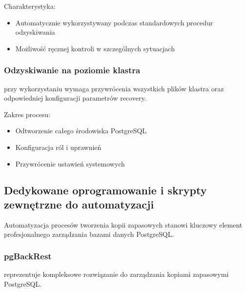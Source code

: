 \documentclass[letterpaper,10pt,polish]{sphinxmanual}
\begin{document}
\sphinxAtStartPar
Charakterystyka:
\begin{itemize}
\item {} 
\sphinxAtStartPar
Automatycznie wykorzystywany podczas standardowych procedur odzyskiwania

\item {} 
\sphinxAtStartPar
Możliwość ręcznej kontroli w szczególnych sytuacjach

\end{itemize}


\subsubsection{Odzyskiwanie na poziomie klastra}
\label{\detokenize{rozdzial2/Kopie_zapasowe_i_odzyskiwanie_danych/kopie_zapasowe_i_odzyskiwanie_danych:odzyskiwanie-na-poziomie-klastra}}
\sphinxAtStartPar
{} przy wykorzystaniu  wymaga przywrócenia wszystkich plików klastra oraz odpowiedniej konfiguracji parametrów recovery.

\sphinxAtStartPar
Zakres procesu:
\begin{itemize}
\item {} 
\sphinxAtStartPar
Odtworzenie całego środowiska PostgreSQL

\item {} 
\sphinxAtStartPar
Konfiguracja ról i uprawnień

\item {} 
\sphinxAtStartPar
Przywrócenie ustawień systemowych

\end{itemize}


\subsection{Dedykowane oprogramowanie i skrypty zewnętrzne do automatyzacji}
\label{\detokenize{rozdzial2/Kopie_zapasowe_i_odzyskiwanie_danych/kopie_zapasowe_i_odzyskiwanie_danych:dedykowane-oprogramowanie-i-skrypty-zewnetrzne-do-automatyzacji}}
\sphinxAtStartPar
Automatyzacja procesów tworzenia kopii zapasowych stanowi kluczowy element profesjonalnego zarządzania bazami danych PostgreSQL.


\subsubsection{pgBackRest}
\label{\detokenize{rozdzial2/Kopie_zapasowe_i_odzyskiwanie_danych/kopie_zapasowe_i_odzyskiwanie_danych:pgbackrest}}
\sphinxAtStartPar
{} reprezentuje kompleksowe rozwiązanie do zarządzania kopiami zapasowymi PostgreSQL.
\end{document}
